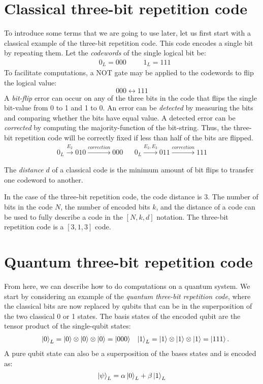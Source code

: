 \section{Classical three-bit repetition code}\label{sec:classical3bit}
To introduce some terms that we are going to use later, let us first start with a classical example of the three-bit repetition code. This code encodes a single bit by repeating them. Let the \emph{codewords} of the single logical bit be:
\begin{align}\label{eq:qb_3bitlogical}
    && 0_L = 000 &&& 1_L=111 &
\end{align}
To facilitate computations, a NOT gate may be applied to the codewords to flip the logical value:
\begin{equation}
 000 \leftrightarrow 111
\end{equation}
A \emph{bit-flip} error can occur on any of the three bits in the code that flips the single bit-value from 0 to 1 and 1 to 0. An error can be \emph{detected} by measuring the bits and comparing whether the bits have equal value. A detected error can be \emph{corrected} by computing the majority-function of the bit-string. Thus, the three-bit repetition code will be correctly fixed if less than half of the bits are flipped.
\begin{align}
  0_L \xrightarrow{E_2} 010 \xrightarrow{correction} 000 && 0_L \xrightarrow{E_2, E_3} 011 \xrightarrow{correction} 111
\end{align}
\begin{definition}\label{def:distance}
  The \emph{distance} $d$ of a classical code is the minimum amount of bit flips to transfer one codeword to another. 
\end{definition}
In the case of the three-bit repetition code, the code distance is 3. The number of bits in the code $N$, the number of encoded bits $k$, and the distance of a code can be used to fully describe a code in the $[N, k, d]$ notation. The three-bit repetition code is a $[3,1,3]$ code.

\section{Quantum three-bit repetition code}\label{sec:quantum3bit}

From here, we can describe how to do computations on a quantum system. We start by considering an example of the \emph{quantum three-bit repetition code}, where the classical bits are now replaced by qubits that can be in the superposition of the two classical 0 or 1 states. The basis states of the encoded qubit are the tensor product of the single-qubit states:
\begin{align}\label{eq:qb_3bitlogicalq}
&& \ket{0}_L = \ket{0}\otimes\ket{0}\otimes\ket{0} = \ket{000} && \ket{1}_L = \ket{1}\otimes\ket{1}\otimes\ket{1} = \ket{111}.
\end{align}
A pure qubit state can also be a superposition of the bases states and is encoded as:
\begin{equation}\label{eq:qec_3bitstate}
  \ket{\psi}_L = \alpha\ket{0}_L + \beta\ket{1}_L
\end{equation}

